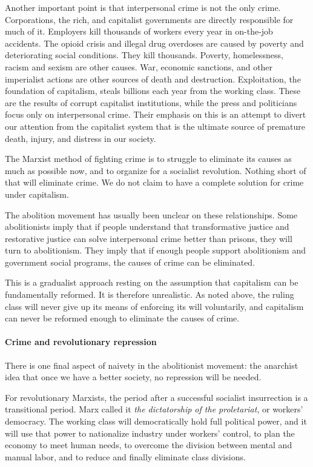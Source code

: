 Another important point is that interpersonal crime is not the only crime. Corporations, the rich, and capitalist governments are directly responsible for much of it. Employers kill thousands of workers every year in on-the-job accidents. The opioid crisis and illegal drug overdoses are caused by poverty and deteriorating social conditions. They kill thousands. Poverty, homelessness, racism and sexism are other causes. War, economic sanctions, and other imperialist actions are other sources of death and destruction. Exploitation, the foundation of capitalism, steals billions each year from the working class. These are the results of corrupt capitalist institutions, while the press and politicians focus only on interpersonal crime. Their emphasis on this is an attempt to divert our attention from the capitalist system that is the ultimate source of premature death, injury, and distress in our society.

The Marxist method of fighting crime is to struggle to eliminate its causes as much as possible now, and to organize for a socialist revolution. Nothing short of that will eliminate crime. We do not claim to have a complete solution for crime under capitalism.

The abolition movement has usually been unclear on these relationships. Some abolitionists imply that if people understand that transformative justice and restorative justice can solve interpersonal crime better than prisons, they will turn to abolitionism. They imply that if enough people support abolitionism and government social programs, the causes of crime can be eliminated.

This is a gradualist approach resting on the assumption that capitalism can be fundamentally reformed. It is therefore unrealistic. As noted above, the ruling class will never give up its means of enforcing its will voluntarily, and capitalism can never be reformed enough to eliminate the causes of crime.

\paragraph{Crime and revolutionary repression}

There is one final aspect of naivety in the abolitionist movement: the anarchist idea that once we have a better society, no repression will be needed.

For revolutionary Marxists, the period after a successful socialist insurrection is a transitional period. Marx called it \emph{the dictatorship of the proletariat}, or workers' democracy. The working class will democratically hold full political power, and it will use that power to nationalize industry under workers' control, to plan the economy to meet human needs, to overcome the division between mental and manual labor, and to reduce and finally eliminate class divisions.

